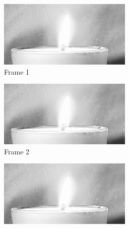 \documentclass[a4paper, landscape]{article}
\begin{document}
\begin{figure}[H]
	\begin{subfigure}{0.13\linewidth}
		\centering
		\includegraphics[width=\linewidth]{flame/frame = 1.png}
		\caption{Frame 1}
	\end{subfigure}
	\begin{subfigure}{0.13\linewidth}
		\centering
		\includegraphics[width=\linewidth]{flame/frame = 2.png}
		\caption{Frame 2}
	\end{subfigure}
	\begin{subfigure}{0.13\linewidth}
		\centering
		\includegraphics[width=\linewidth]{flame/frame = 3.png}

\end{subfigure}
\end{figure}
\end{document}
